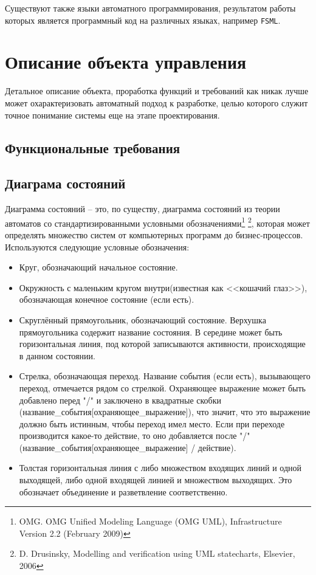 \documentclass[12pt, twoside]{report}
\begin{document}
Существуют также языки автоматного программирования, результатом работы которых является программный 
код на различных языках, например \texttt{FSML}\cite{Lagunov:FSML}.

\chapter*{Описание объекта управления}

Детальное описание объекта, проработка функций и требований как никак лучше может охарактеризовать автоматный подход к разработке, целью которого служит точное понимание системы еще на этапе проектирования.

\section*{Функциональные требования}



\section*{Диаграма состояний}

Диаграмма состояний -- это, по существу, диаграмма состояний из теории автоматов со стандартизированными условными обозначениями\footnote{OMG. OMG Unified Modeling Language (OMG UML), Infrastructure Version 2.2 (February 2009)} \footnote{D. Drusinsky, Modelling and verification using UML statecharts, Elsevier, 2006}, которая может определять множество систем от компьютерных программ до бизнес-процессов. Используются следующие условные обозначения:
\begin{itemize}
  \item Круг, обозначающий начальное состояние.
  \item Окружность с маленьким кругом внутри(известная как <<кошачий глаз>>), обозначающая конечное состояние (если есть).
  \item Скруглённый прямоугольник, обозначающий состояние. Верхушка прямоугольника содержит название состояния. В середине может быть горизонтальная линия, под которой записываются активности, происходящие в данном состоянии.
  \item Стрелка, обозначающая переход. Название события (если есть), вызывающего переход, отмечается рядом со стрелкой. Охраняющее выражение может быть добавлено перед "/" и заключено в квадратные скобки (название\_события[охраняющее\_выражение]), что значит, что это выражение должно быть истинным, чтобы переход имел место. Если при переходе производится какое-то действие, то оно добавляется после "/" (название\_события[охраняющее\_выражение] / действие).
  \item Толстая горизонтальная линия с либо множеством входящих линий и одной выходящей, либо одной входящей линией и множеством выходящих. Это обозначает объединение и разветвление соответственно.
\end{itemize}
\end{document}
